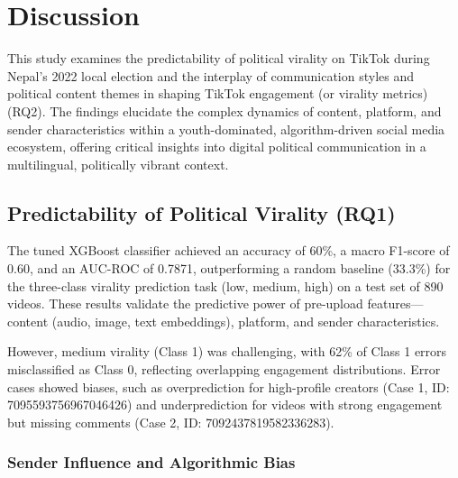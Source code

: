\documentclass[12pt,a4paper]{report}
\begin{document}
\chapter{Discussion}
\label{chap:discussion}

This study examines the predictability of political virality on TikTok during Nepal’s 2022 local election and the interplay of communication styles and political content themes in shaping TikTok engagement (or virality metrics) (RQ2). The findings elucidate the complex dynamics of content, platform, and sender characteristics within a youth-dominated, algorithm-driven social media ecosystem, offering critical insights into digital political communication in a multilingual, politically vibrant context.

\section{Predictability of Political Virality (RQ1)}
\label{sec:rq1_discussion}
The tuned XGBoost classifier achieved an accuracy of 60\%, a macro F1-score of 0.60, and an AUC-ROC of 0.7871, outperforming a random baseline (33.3\%) for the three-class virality prediction task (low, medium, high) on a test set of 890 videos. These results validate the predictive power of pre-upload features—content (audio, image, text embeddings), platform, and sender characteristics.

However, medium virality (Class 1) was challenging, with 62\% of Class 1 errors misclassified as Class 0, reflecting overlapping engagement distributions. Error cases showed biases, such as overprediction for high-profile creators (Case 1, ID: 7095593756967046426) and underprediction for videos with strong engagement but missing comments (Case 2, ID: 7092437819582336283). 

\subsection{Sender Influence and Algorithmic Bias}
\end{document}
